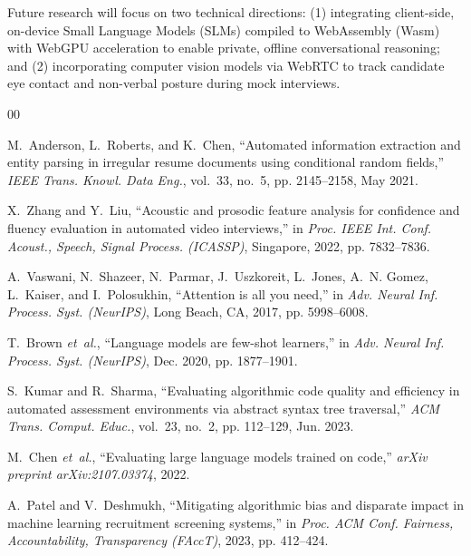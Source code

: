 \documentclass[conference]{IEEEtran}
\begin{document}
Future research will focus on two technical directions: (1) integrating client-side, on-device Small Language Models (SLMs) compiled to WebAssembly (Wasm) with WebGPU acceleration to enable private, offline conversational reasoning; and (2) incorporating computer vision models via WebRTC to track candidate eye contact and non-verbal posture during mock interviews.

\begin{thebibliography}{00}

M.~Anderson, L.~Roberts, and K.~Chen, ``Automated information extraction and entity parsing in irregular resume documents using conditional random fields,'' \emph{IEEE Trans. Knowl. Data Eng.}, vol.~33, no.~5, pp. 2145--2158, May 2021.

X.~Zhang and Y.~Liu, ``Acoustic and prosodic feature analysis for confidence and fluency evaluation in automated video interviews,'' in \emph{Proc. IEEE Int. Conf. Acoust., Speech, Signal Process. (ICASSP)}, Singapore, 2022, pp. 7832--7836.

A.~Vaswani, N.~Shazeer, N.~Parmar, J.~Uszkoreit, L.~Jones, A.~N. Gomez, L.~Kaiser, and I.~Polosukhin, ``Attention is all you need,'' in \emph{Adv. Neural Inf. Process. Syst. (NeurIPS)}, Long Beach, CA, 2017, pp. 5998--6008.

T.~Brown \emph{et~al.}, ``Language models are few-shot learners,'' in \emph{Adv. Neural Inf. Process. Syst. (NeurIPS)}, Dec. 2020, pp. 1877--1901.

S.~Kumar and R.~Sharma, ``Evaluating algorithmic code quality and efficiency in automated assessment environments via abstract syntax tree traversal,'' \emph{ACM Trans. Comput. Educ.}, vol.~23, no.~2, pp. 112--129, Jun. 2023.

M.~Chen \emph{et~al.}, ``Evaluating large language models trained on code,'' \emph{arXiv preprint arXiv:2107.03374}, 2022.

A.~Patel and V.~Deshmukh, ``Mitigating algorithmic bias and disparate impact in machine learning recruitment screening systems,'' in \emph{Proc. ACM Conf. Fairness, Accountability, Transparency (FAccT)}, 2023, pp. 412--424.


\end{thebibliography}
\end{document}
